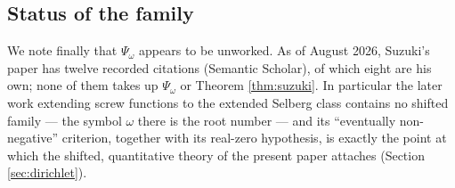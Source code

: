 \documentclass[11pt,reqno]{amsart}
\theoremstyle{plain}
\theoremstyle{definition}
\begin{document}
\subsection{Status of the family}
We note finally that $\Psi_\omega$ appears to be unworked. As of August 2026, Suzuki's paper has
twelve recorded citations (Semantic Scholar), of which eight are his own; none of them takes up
$\Psi_\omega$ or Theorem \ref{thm:suzuki}. In particular the later work extending screw functions
to the extended Selberg class \cite{SuzukiSelberg} contains no shifted family --- the symbol
$\omega$ there is the root number --- and its ``eventually non-negative'' criterion, together
with its real-zero hypothesis, is exactly the point at which the shifted, quantitative theory of
the present paper attaches (Section \ref{sec:dirichlet}).
\end{document}

